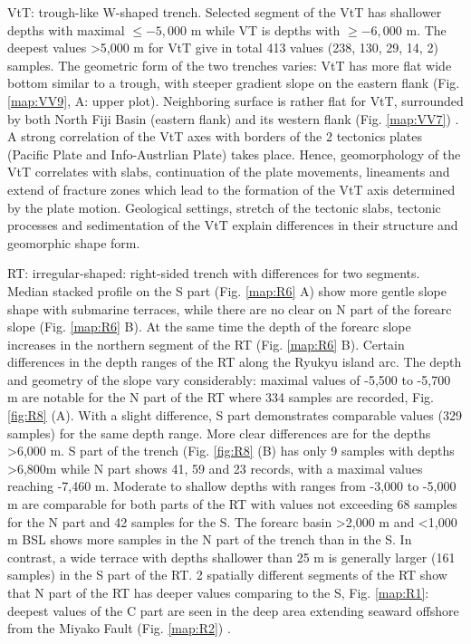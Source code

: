 \documentclass[11pt,a4paper]{report}
\begin{document}
{\ac{VtT}: trough-like W-shaped trench. Selected segment of the \ac{VtT} has shallower depths with maximal $\leq -5,000$ m while \ac{VT} is depths with $\geq -6,000$ m. The deepest values >5,000 m for \ac{VtT} give in total 413 values (238, 130, 29, 14, 2) samples. The geometric form of the two trenches varies: \ac{VtT} has more flat wide bottom similar to a trough, with steeper gradient slope on the eastern flank (Fig. \ref{map:VV9}, A: upper plot). Neighboring surface is rather flat for \ac{VtT}, surrounded by both North Fiji Basin (eastern flank) and its western flank (Fig. \ref{map:VV7}) \cite{Lemenkova202022}. A strong correlation of the \ac{VtT} axes with borders of the 2 tectonics plates (Pacific Plate and Info-Austrlian Plate) takes place. Hence, geomorphology of the \ac{VtT} correlates with slabs, continuation of the plate movements, lineaments and extend of fracture zones which lead to the formation of the \ac{VtT} axis determined by the plate motion. Geological settings, stretch of the tectonic slabs, tectonic processes and sedimentation of the \ac{VtT} explain differences in their structure and geomorphic shape form.

\ac{RT}: irregular-shaped: right-sided trench with differences for two segments. Median stacked profile on the S part (Fig. \ref{map:R6} A) show more gentle slope shape with submarine terraces, while there are no clear on N part of the forearc slope (Fig. \ref{map:R6} B). At the same time the depth of the forearc slope increases in the northern segment of the \ac{RT} (Fig. \ref{map:R6} B). Certain differences in the depth ranges of the \ac{RT} along the Ryukyu island arc. The depth and geometry of the slope vary considerably: maximal values of -5,500 to -5,700 m are notable for the N part of the \ac{RT} where 334 samples are recorded, Fig. \ref{fig:R8} (A). With a slight difference, S part demonstrates comparable values (329 samples) for the same depth range. More clear differences are for the depths >6,000 m. S part of the trench (Fig. \ref{fig:R8} (B) has only 9 samples with depths >6,800m while N part shows 41, 59 and 23 records, with a maximal values reaching -7,460 m. Moderate to shallow depths with ranges from -3,000 to -5,000 m are comparable for both parts of the \ac{RT} with values not exceeding 68 samples for the N part and 42 samples for the S. The forearc basin >2,000 m and <1,000 m \ac{BSL} shows more samples in the N part of the trench than in the S. In contrast, a wide terrace with depths shallower than 25 m is generally larger (161 samples) in the S part of the \ac{RT}. 2 spatially different segments of the \ac{RT} show that N part of the \ac{RT} has deeper values comparing to the S, Fig. \ref{map:R1}: deepest values of the C part are seen in the deep area extending seaward offshore from the Miyako Fault (Fig. \ref{map:R2}) \cite{Lemenkova202017}.

}
\end{document}
